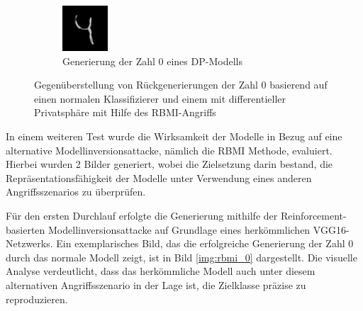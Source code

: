 \begin{figure}[H]
\begin{subfigure}[b]{0.35\linewidth}
		\includegraphics[width=\linewidth]{Bilder/0_rbmi_dp.png}
		\caption{Generierung der Zahl 0 eines DP-Modells}
		\label{img:rbmi_0_dp}
	\end{subfigure}
	\caption{Gegenüberstellung von Rückgenerierungen der Zahl 0 basierend auf einen normalen Klassifizierer und einem mit differentieller Privatsphäre mit Hilfe des \glqq RBMI\grqq-Angriffs}
	\label{img:rbmi_dpvsnorm}
\end{figure}

In einem weiteren Test wurde die Wirksamkeit der Modelle in Bezug auf eine alternative Modellinversionsattacke, nämlich die RBMI Methode, evaluiert. Hierbei wurden 2 Bilder generiert, wobei die Zielsetzung darin bestand, die Repräsentationsfähigkeit der Modelle unter Verwendung eines anderen Angriffsszenarios zu überprüfen.

Für den ersten Durchlauf erfolgte die Generierung mithilfe der Reinforcement-basierten Modellinversionsattacke auf Grundlage eines herkömmlichen VGG16-Netzwerks. Ein exemplarisches Bild, das die erfolgreiche Generierung der Zahl 0 durch das normale Modell zeigt, ist in Bild \ref{img:rbmi_0} dargestellt. Die visuelle Analyse verdeutlicht, dass das herkömmliche Modell auch unter diesem alternativen Angriffsszenario in der Lage ist, die Zielklasse präzise zu reproduzieren.

